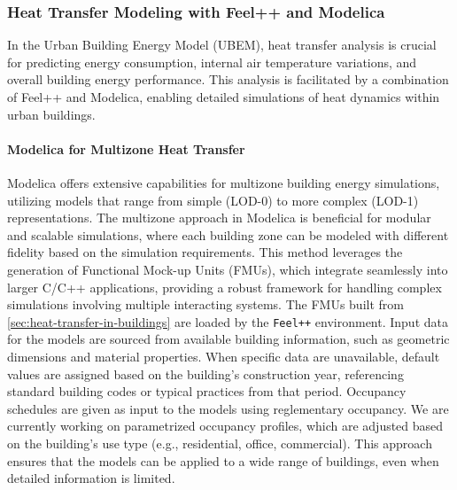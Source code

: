 \documentclass[runningheads]{llncs}
\begin{document}

\subsubsection{Heat Transfer Modeling with Feel++ and Modelica}
In the Urban Building Energy Model (UBEM), heat transfer analysis is crucial for predicting energy consumption, internal air temperature variations, and overall building energy performance. This analysis is facilitated by a combination of Feel++ and Modelica, enabling detailed simulations of heat dynamics within urban buildings.

\paragraph{Modelica for Multizone Heat Transfer}
Modelica offers extensive capabilities for multizone building energy simulations, utilizing models that range from simple (LOD-0) to more complex (LOD-1) representations. The multizone approach in Modelica is beneficial for modular and scalable simulations, where each building zone can be modeled with different fidelity based on the simulation requirements. This method leverages the generation of Functional Mock-up Units (FMUs), which integrate seamlessly into larger C/C++ applications, providing a robust framework for handling complex simulations involving multiple interacting systems.
The FMUs built from \cref{sec:heat-transfer-in-buildings} are loaded by the \texttt{Feel++} environment.
Input data for the models are sourced from available building information, such as geometric dimensions and material properties.
When specific data are unavailable, default values are assigned based on the building's construction year, referencing standard building codes or typical practices from that period.
Occupancy schedules are given as input to the models using reglementary occupancy.
We are currently working on parametrized occupancy profiles, which are adjusted based on the building's use type (e.g., residential, office, commercial).
This approach ensures that the models can be applied to a wide range of buildings, even when detailed information is limited.
\end{document}
